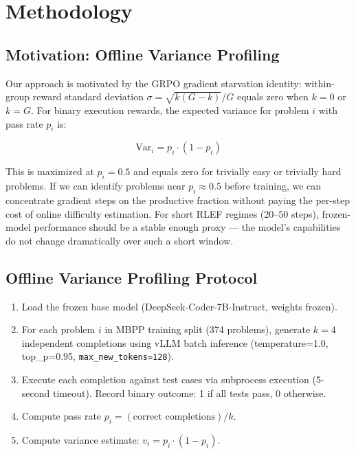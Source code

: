 \section{Methodology}

\subsection{Motivation: Offline Variance Profiling}

Our approach is motivated by the GRPO gradient starvation identity: within-group reward standard deviation $\sigma = \sqrt{k(G-k)}/G$ equals zero when $k=0$ or $k=G$. For binary execution rewards, the expected variance for problem $i$ with pass rate $p_i$ is:

\begin{equation}
\mathrm{Var}_i = p_i \cdot (1 - p_i)
\end{equation}

This is maximized at $p_i = 0.5$ and equals zero for trivially easy or trivially hard problems. If we can identify problems near $p_i \approx 0.5$ before training, we can concentrate gradient steps on the productive fraction without paying the per-step cost of online difficulty estimation. For short RLEF regimes (20--50 steps), frozen-model performance should be a stable enough proxy --- the model's capabilities do not change dramatically over such a short window.

\subsection{Offline Variance Profiling Protocol}

\begin{enumerate}
\item Load the frozen base model (DeepSeek-Coder-7B-Instruct, weights frozen).
\item For each problem $i$ in MBPP training split (374 problems), generate $k=4$ independent completions using vLLM batch inference (temperature=1.0, top\_p=0.95, \texttt{max\_new\_tokens=128}).
\item Execute each completion against test cases via subprocess execution (5-second timeout). Record binary outcome: 1 if all tests pass, 0 otherwise.
\item Compute pass rate $p_i = (\text{correct completions}) / k$.
\item Compute variance estimate: $v_i = p_i \cdot (1 - p_i)$.
\end{enumerate}


